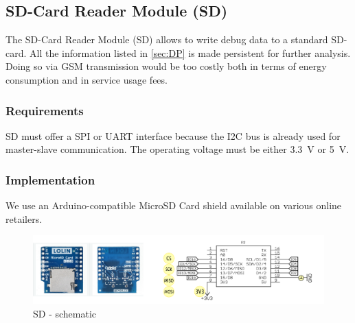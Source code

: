 \subsection{SD-Card Reader Module (SD) }

The SD-Card Reader Module (SD) allows to write debug data to a standard SD-card. All the information listed in
\ref{sec:DP} is made persistent for further analysis.
Doing so via GSM transmission would be too costly both in terms of energy consumption and in service usage fees.

\subsubsection{Requirements}

SD must offer a SPI or UART interface because the I2C bus is already used for master-slave communication.
The operating voltage must be either \SI{3.3}{\volt} or \SI{5}{\volt}.

\subsubsection{Implementation}

We use an Arduino-compatible MicroSD Card shield available on various online retailers.

\begin{figure}[h]
    \centering
    \includegraphics[width=1.0\textwidth]{SL/SD/SD}
    \caption{SD - schematic}

\end{figure}


